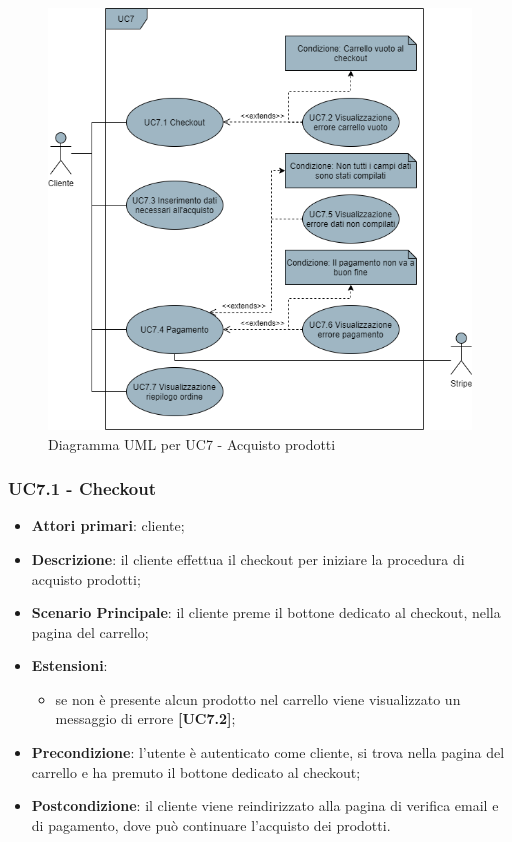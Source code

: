 \begin{figure}[H]
\centering
\includegraphics[scale=0.6]{res/UseCase/Immagini/AcquistoProdotti}
\caption{Diagramma UML per UC7 - Acquisto prodotti}
\end{figure}

\subsubsection{UC7.1 - Checkout}
\begin{itemize}
\item \textbf{Attori primari}: cliente;
\item \textbf{Descrizione}: il cliente effettua il checkout per iniziare la procedura di acquisto prodotti;
\item \textbf{Scenario Principale}: il cliente preme il bottone dedicato al checkout, nella pagina del carrello;
\item \textbf{Estensioni}:
\begin{itemize}
\item se non è presente alcun prodotto nel carrello viene visualizzato un messaggio di errore \textbf{[UC7.2]};
\end{itemize}
\item \textbf{Precondizione}: l'utente è autenticato come cliente, si trova nella pagina del carrello e ha premuto il bottone dedicato al checkout;
\item \textbf{Postcondizione}: il cliente viene reindirizzato alla pagina di verifica email e di pagamento, dove può continuare l'acquisto dei prodotti.
\end{itemize}

